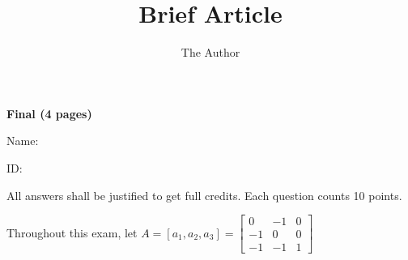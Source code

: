 \documentclass[11pt]{amsart}
\title{Brief Article}
\author{The Author}
\begin{document}

\begin{center}
{\bf Final (4 pages)}
\end{center}

Name: 

ID: 

All answers shall be justified to get full credits. Each question counts 10 points.
\vspace{.2in}

Throughout this exam, let 
$A = [a_1, a_2, a_3] = 
\begin{bmatrix}
0 & -1 & 0\\
-1 & 0 & 0 \\
-1 & -1 & 1
\end{bmatrix}
$

\vspace{.2in}
\end{document}
